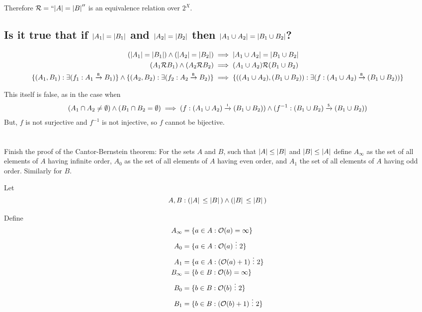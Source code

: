 \documentclass[]{article}
\newcommand{\Rel}{\mathcal{R}}
\newcommand{\toI}{\xrightarrow{\textsf{\tiny I}}}
\newcommand{\toS}{\xrightarrow{\textsf{\tiny S}}}
\newcommand{\divisible}{ \ \vdots \ }
\begin{document}
Therefore $\Rel = ``\abs{A} = \abs{B}''$ is an equivalence relation over $2^X$.

\newpage
\subsection{
	Is it true that if $\abs{A_1}=\abs{B_1}$ and $\abs{A_2}=\abs{B_2}$ 
	then $\abs{A_1 \cup A_2} = \abs{B_1 \cup B_2}$?
}
\begin{align*}
	(\abs{A_1} = \abs{B_1}) \land (\abs{A_2} = \abs{B_2})
		&\implies \abs{A_1 \cup A_2} = \abs{B_1 \cup B_2}\\
	(A_1 \Rel B_1) \land (A_2 \Rel B_2)
		&\implies (A_1 \cup A_2) \Rel (B_1 \cup B_2)\\
	\{(A_1,B_1) : \exists (f_1 : A_1 \xrightarrow{\textsf{\tiny B}} B_1)\}
		\land \{(A_2,B_2) : \exists (f_2 : A_2 \xrightarrow{\textsf{\tiny B}} B_2)\}
		&\implies \{((A_1 \cup A_2), (B_1 \cup B_2)) 
			: \exists (f : (A_1 \cup A_2) \xrightarrow{\textsf{\tiny B}} (B_1 \cup B_2))\}
\end{align*}

This itself is false, as in the case when 
\begin{align*}
	(A_1 \cap A_2 \neq \emptyset) \land (B_1 \cap B_2 = \emptyset)
	\implies (f : (A_1 \cup A_2) \toI (B_1 \cup B_2))
	\land (f^{-1} : (B_1 \cup B_2) \toS (B_1 \cup B_2))
\end{align*}
But, $f$ is not surjective and $f^{-1}$ is not injective, so $f$ cannot be bijective.

\newpage
\section{}
Finish the proof of the Cantor-Bernstein theorem:
For the sets $A$ and $B$, such that $\abs{A} \leq \abs{B}$ and $\abs{B} \leq \abs{A}$
define $A_\infty$ as the set of all elements of $A$ having infinite order,
$A_0$ as the set of all elements of $A$ having even order,
and $A_1$ the set of all elements of $A$ having odd order. Similarly for $B$.

Let
$$A,B : (\abs*{A} \leq \abs*{B}) \land (\abs*{B} \leq \abs*{B})$$

Define
\begin{align*}
	A_\infty &= \{a \in A : \order*{a} = \infty\}\\
	A_0 &= \{a \in A : \order*{a} \divisible 2\}\\
	A_1 &= \{a \in A : (\order*{a} + 1) \divisible 2\}\\
	B_\infty &= \{b \in B : \order*{b} = \infty\}\\
	B_0 &= \{b \in B : \order*{b} \divisible 2 \}\\
	B_1 &= \{b \in B : (\order*{b} + 1) \divisible 2\}\\
\end{align*}
\end{document}
